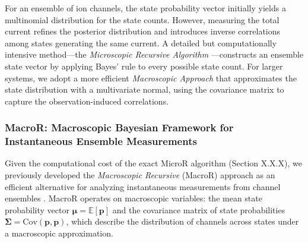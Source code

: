 \documentclass[pdflatex,sn-nature]{sn-jnl}%
\begin{document}
For an ensemble of ion channels, the state probability vector initially yields a multinomial distribution for the state counts. However, measuring the total current refines the posterior distribution and introduces inverse correlations among states generating the same current. A detailed but computationally intensive method—the \textit{Microscopic Recursive Algorithm} \cite{Moffatt}—constructs an ensemble state vector by applying Bayes’ rule to every possible state count. For larger systems, we adopt a more efficient \textit{Macroscopic Approach} that approximates the state distribution with a multivariate normal, using the covariance matrix to capture the observation-induced correlations.

\subsubsection{MacroR: Macroscopic Bayesian Framework for Instantaneous Ensemble Measurements}

Given the computational cost of the exact MicroR algorithm (Section X.X.X), we previously developed the \textit{Macroscopic Recursive} (MacroR) approach as an efficient alternative for analyzing instantaneous measurements from channel ensembles \cite{Moffatt}. MacroR operates on macroscopic variables: the mean state probability vector \( \boldsymbol{\mu} = \mathbb{E}[\boldsymbol{p}] \) and the covariance matrix of state probabilities \( \boldsymbol{\Sigma} = \text{Cov}(\boldsymbol{p}, \boldsymbol{p}) \), which describe the distribution of channels across states under a macroscopic approximation. 
\end{document}
